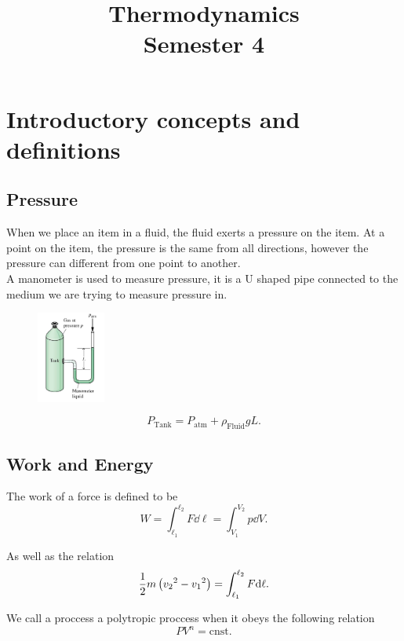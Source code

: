 \documentclass{report}
\title{\Huge{Thermodynamics}\\Semester 4}
\author{}
\date{}
\begin{document}
\maketitle
\newpage%
\tableofcontents
\pagebreak


\chapter{Introductory concepts and definitions}
\section{Pressure}

When we place an item in a fluid, the fluid exerts a pressure on the item. At a point on the item, the pressure is the same from all directions, however the pressure can different from one point to another.
\\
A manometer is used to measure pressure, it is a U shaped pipe connected to the medium we are trying to measure pressure in.

\begin{figure}[H]
	\centering
	\includegraphics[width=0.2\textwidth]{figs/man.png}
\end{figure}

\[
	P_\text{Tank} =  P_\text{atm} + \rho_\text{Fluid}gL
	.\]


\section{Work and Energy}

The work of a force is defined to be
\[
	W = \int_{\ell_1}^{\ell_2} F \dd{\ell} = \int_{V_1}^{V_2}p\dd{V}
	.\]

As well as the relation
\[
	\frac{1}{2}m\left({v_2}^2 - {v_1}^2\right) = \int_{\ell_1}^{\ell_2} F \mathrm{d}\ell
	.\]

We call a proccess a polytropic proccess when it obeys the following relation
\[
	PV^n = \text{cnst}
	.\]
\end{document}
